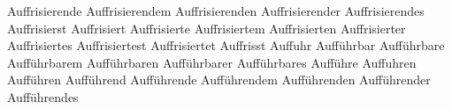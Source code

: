 \documentclass{article}
\begin{document}

Auffrisierende Auffrisierendem Auffrisierenden Auffrisierender
Auffrisierendes Auffrisierst Auffrisiert Auffrisierte Auffrisiertem
Auffrisierten Auffrisierter Auffrisiertes Auffrisiertest Auffrisiertet
Auffrisst Auffuhr Aufführbar Aufführbare Aufführbarem Aufführbaren
Aufführbarer Aufführbares Aufführe Auffuhren Aufführen Aufführend
Aufführende Aufführendem Aufführenden Aufführender Aufführendes
\end{document}
